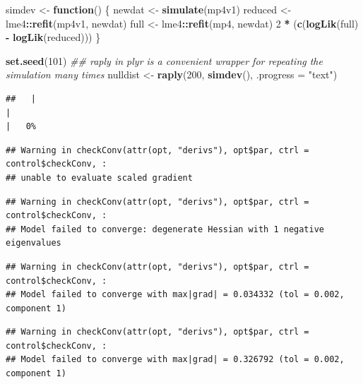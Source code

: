 \documentclass[
  12pt,
]{book}
\newenvironment{Shaded}{\begin{snugshade}}{\end{snugshade}}
\newcommand{\CommentTok}[1]{\textcolor[rgb]{0.56,0.35,0.01}{\textit{#1}}}
\newcommand{\ControlFlowTok}[1]{\textcolor[rgb]{0.13,0.29,0.53}{\textbf{#1}}}
\newcommand{\DataTypeTok}[1]{\textcolor[rgb]{0.13,0.29,0.53}{#1}}
\newcommand{\DecValTok}[1]{\textcolor[rgb]{0.00,0.00,0.81}{#1}}
\newcommand{\KeywordTok}[1]{\textcolor[rgb]{0.13,0.29,0.53}{\textbf{#1}}}
\newcommand{\NormalTok}[1]{#1}
\newcommand{\OperatorTok}[1]{\textcolor[rgb]{0.81,0.36,0.00}{\textbf{#1}}}
\newcommand{\StringTok}[1]{\textcolor[rgb]{0.31,0.60,0.02}{#1}}
\begin{document}
\begin{Shaded}
\begin{Highlighting}[]
\NormalTok{simdev <-}\StringTok{ }\ControlFlowTok{function}\NormalTok{() \{}
\NormalTok{  newdat <-}\StringTok{ }\KeywordTok{simulate}\NormalTok{(mp4v1)}
\NormalTok{  reduced <-}\StringTok{ }\NormalTok{lme4}\OperatorTok{::}\KeywordTok{refit}\NormalTok{(mp4v1, newdat)}
\NormalTok{  full <-}\StringTok{ }\NormalTok{lme4}\OperatorTok{::}\KeywordTok{refit}\NormalTok{(mp4, newdat)}
  \DecValTok{2} \OperatorTok{*}\StringTok{ }\NormalTok{(}\KeywordTok{c}\NormalTok{(}\KeywordTok{logLik}\NormalTok{(full) }\OperatorTok{-}\StringTok{ }\KeywordTok{logLik}\NormalTok{(reduced)))}
\NormalTok{\}}

\KeywordTok{set.seed}\NormalTok{(}\DecValTok{101}\NormalTok{)}
\CommentTok{## raply in plyr is a convenient wrapper for repeating the simulation many times}
\NormalTok{nulldist <-}\StringTok{ }\KeywordTok{raply}\NormalTok{(}\DecValTok{200}\NormalTok{, }\KeywordTok{simdev}\NormalTok{(), }\DataTypeTok{.progress =} \StringTok{"text"}\NormalTok{)}
\end{Highlighting}
\end{Shaded}

\begin{verbatim}
##   |                                                                              |                                                                      |   0%
\end{verbatim}

\begin{verbatim}
## Warning in checkConv(attr(opt, "derivs"), opt$par, ctrl = control$checkConv, :
## unable to evaluate scaled gradient
\end{verbatim}

\begin{verbatim}
## Warning in checkConv(attr(opt, "derivs"), opt$par, ctrl = control$checkConv, :
## Model failed to converge: degenerate Hessian with 1 negative eigenvalues
\end{verbatim}

\begin{verbatim}
## Warning in checkConv(attr(opt, "derivs"), opt$par, ctrl = control$checkConv, :
## Model failed to converge with max|grad| = 0.034332 (tol = 0.002, component 1)
\end{verbatim}

\begin{verbatim}
## Warning in checkConv(attr(opt, "derivs"), opt$par, ctrl = control$checkConv, :
## Model failed to converge with max|grad| = 0.326792 (tol = 0.002, component 1)
\end{verbatim}
\end{document}
